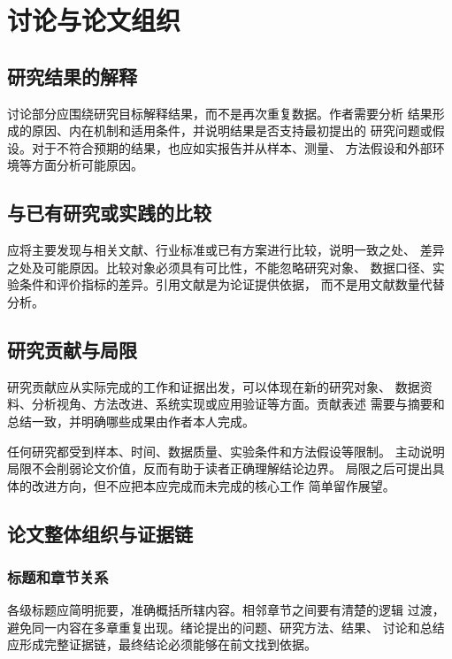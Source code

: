 \chapter{讨论与论文组织}

\section{研究结果的解释}

讨论部分应围绕研究目标解释结果，而不是再次重复数据。作者需要分析
结果形成的原因、内在机制和适用条件，并说明结果是否支持最初提出的
研究问题或假设。对于不符合预期的结果，也应如实报告并从样本、测量、
方法假设和外部环境等方面分析可能原因。

\section{与已有研究或实践的比较}

应将主要发现与相关文献、行业标准或已有方案进行比较，说明一致之处、
差异之处及可能原因。比较对象必须具有可比性，不能忽略研究对象、
数据口径、实验条件和评价指标的差异。引用文献是为论证提供依据，
而不是用文献数量代替分析\cite{kanamori1998shaking,zhu1996fluid}。

\section{研究贡献与局限}

研究贡献应从实际完成的工作和证据出发，可以体现在新的研究对象、
数据资料、分析视角、方法改进、系统实现或应用验证等方面。贡献表述
需要与摘要和总结一致，并明确哪些成果由作者本人完成。

任何研究都受到样本、时间、数据质量、实验条件和方法假设等限制。
主动说明局限不会削弱论文价值，反而有助于读者正确理解结论边界。
局限之后可提出具体的改进方向，但不应把本应完成而未完成的核心工作
简单留作展望。

\section{论文整体组织与证据链}

\subsection{标题和章节关系}

各级标题应简明扼要，准确概括所辖内容。相邻章节之间要有清楚的逻辑
过渡，避免同一内容在多章重复出现。绪论提出的问题、研究方法、结果、
讨论和总结应形成完整证据链，最终结论必须能够在前文找到依据。

